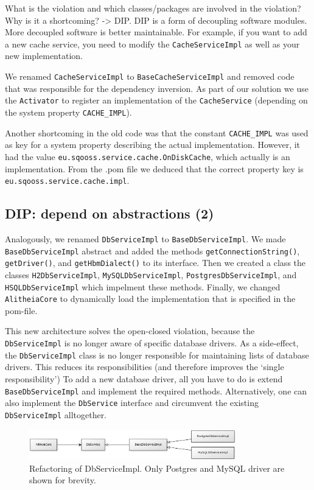\documentclass{article}
\begin{document}
What is the violation and which classes/packages are involved in the violation? Why is it a shortcoming?
 -> DIP. DIP is a form of decoupling software modules. More decoupled software is better maintainable. For example, if you want to add a new cache service, you need to modify the \verb|CacheServiceImpl| as well as your new implementation.

We renamed \verb|CacheServiceImpl| to \verb|BaseCacheServiceImpl| and removed code that was responsible for the dependency inversion. As part of our solution we use the \verb|Activator| to register an implementation of the \verb|CacheService| (depending on the system property \verb|CACHE_IMPL|).

Another shortcoming in the old code was that the constant \verb|CACHE_IMPL| was used as key for a system property describing the actual implementation. However, it had the value \texttt{eu\allowbreak.sqooss.service.cache.OnDiskCache}, which actually is an implementation. From the .pom file we deduced that the correct property key is \verb|eu.sqooss.service.cache.impl|.

\subsection{DIP: depend on abstractions (2)}
Analogously, we renamed \verb|DbServiceImpl| to \verb|BaseDbServiceImpl|. We made \verb|BaseDbServiceImpl| abstract and added the methods \verb|getConnectionString()|, \verb|getDriver()|, and \verb|getHbmDialect()| to its interface. Then we created a class the classes \verb|H2DbServiceImpl|, \verb|MySQLDbServiceImpl|, \verb|PostgresDbServiceImpl|, and \verb|HSQLDbServiceImpl| which impelment these methods. Finally, we changed \verb|AlitheiaCore| to dynamically load the implementation that is specified in the pom-file.

This new architecture solves the open-closed violation, because the \verb|DbServiceImpl| is no longer aware of specific database drivers. As a side-effect, the \verb|DbServiceImpl| class is no longer responsible for maintaining lists of database drivers. This reduces its responsibilities (and therefore improves the `single responsibility') To add a new database driver, all you have to do is extend \verb|BaseDbServiceImpl| and implement the required methods. Alternatively, one can also implement the \verb|DbService| interface and circumvent the existing \verb|DbServiceImpl| alltogether.

\begin{figure}[h]
    \centering
    \includegraphics[width=0.8\textwidth]{dbs}
    \caption{Refactoring of DbServiceImpl. Only Postgres and MySQL driver are shown for brevity.}
    \label{fig:dbs}
\end{figure}
\end{document}
